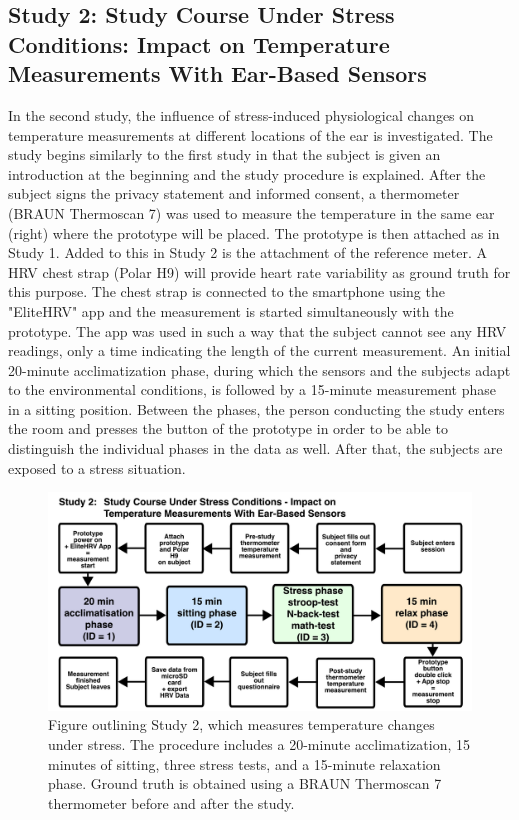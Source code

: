 \subsection{Study 2: Study Course Under Stress Conditions: Impact on Temperature Measurements With Ear-Based Sensors}
\label{ch:Design:Study:Study2}
In the second study, the influence of stress-induced physiological changes on temperature measurements at different locations of the ear is investigated. 
The study begins similarly to the first study in that the subject is given an introduction at the beginning and the study procedure is explained.
After the subject signs the privacy statement and informed consent, a thermometer (BRAUN Thermoscan 7) was used to measure the temperature in the same ear (right) where the prototype will be placed.
The prototype is then attached as in Study 1.
Added to this in Study 2 is the attachment of the reference meter.
A HRV chest strap (Polar H9) will provide heart rate variability as ground truth for this purpose.
The chest strap is connected to the smartphone using the "EliteHRV" app and the measurement is started simultaneously with the prototype.
The app was used in such a way that the subject cannot see any HRV readings, only a time indicating the length of the current measurement.
An initial 20-minute acclimatization phase, during which the sensors and the subjects adapt to the environmental conditions, is followed by a 15-minute measurement phase in a sitting position.
Between the phases, the person conducting the study enters the room and presses the button of the prototype in order to be able to distinguish the individual phases in the data as well.
After that, the subjects are exposed to a stress situation. 
\begin{figure}[!t]
    \centering
    \includegraphics[width=\textwidth]{thesis-doc/images/study2/Procedure2_new.pdf}
    \caption{Figure outlining Study 2, which measures temperature changes under stress. The procedure includes a 20-minute acclimatization, 15 minutes of sitting, three stress tests, and a 15-minute relaxation phase. Ground truth is obtained using a BRAUN Thermoscan 7 thermometer before and after the study.}
    \label{fig:design:study2:procedure}
\end{figure}

